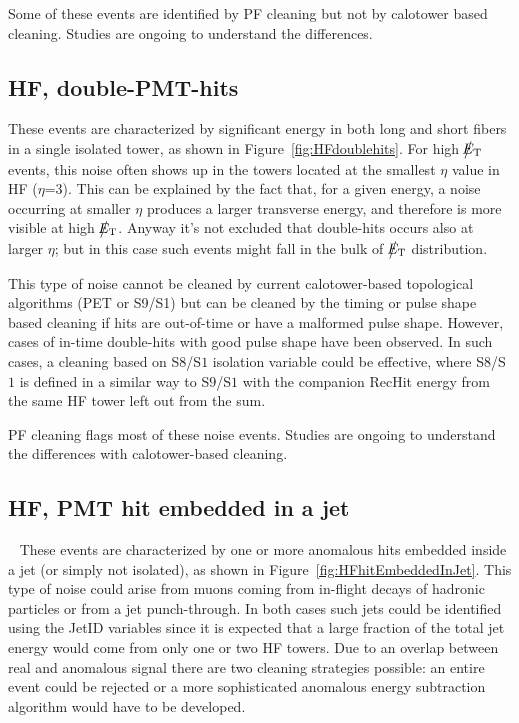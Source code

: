 Some of these events are identified by PF cleaning but not by calotower based cleaning.
Studies are ongoing to understand the differences.

\subsection{HF, double-PMT-hits}
These events are characterized by significant energy in both long and short fibers in a single
isolated tower, as shown in Figure~\ref{fig:HFdoublehits}. For high $\big\slash\hspace{-1.6ex}{E_\text{T}}$ events, 
this noise often shows up in the towers located at the smallest $\eta$ 
value in HF ($\eta$=3). This can be explained by the fact that, for a given energy, 
a noise occurring at smaller $\eta$ produces a larger transverse energy, and therefore is more visible at high $\big\slash\hspace{-1.6ex}{E_\text{T}}$.
Anyway it's not excluded that double-hits occurs also at larger $\eta$; but in this case such events might 
fall in the bulk of $\big\slash\hspace{-1.6ex}{E_\text{T}}$ distribution.

This type of noise cannot be cleaned by current calotower-based topological algorithms (PET or S9/S1) but can
be cleaned by the timing or pulse shape based cleaning if hits are out-of-time or have a malformed pulse shape.
However, cases of in-time double-hits with good pulse shape have been observed. In such cases, a cleaning based on
S$8$/S$1$ isolation variable could be effective, where S$8$/S$1$ is defined in a similar way to S$9$/S$1$
with the companion RecHit energy from the same HF tower left out from the sum. 

PF cleaning flags most of these noise events. Studies are ongoing to understand the differences
with calotower-based cleaning.

\subsection{HF, PMT hit embedded in a jet} ~\label{sec:HFHitEmbeddedInJet}
These events are characterized by one or more anomalous hits embedded inside a jet (or simply not isolated), 
as shown in Figure~\ref{fig:HFhitEmbeddedInJet}. This type of noise could arise from muons coming from 
in-flight decays of hadronic particles or from a jet punch-through. In both cases
such jets could be identified using the JetID variables since it is expected that a large fraction of the
total jet energy would come from only one or two HF towers. Due to an overlap between real and anomalous signal there are
two cleaning strategies possible: an entire event could be rejected or a more sophisticated anomalous energy
subtraction algorithm would have to be developed.

